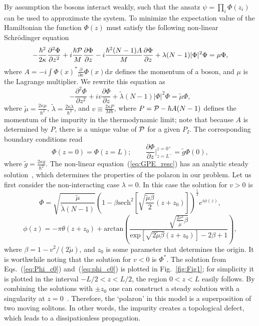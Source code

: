 \documentclass[twocolumn,amsmath,amssymb,showpacs,prl,superscriptaddress,aps]{revtex4-1}
\begin{document}
By assumption the bosons interact weakly, such that the ansatz $\psi=\prod_i \Phi(z_i)$ can be used to approximate the system. 
To minimize the expectation value of the Hamiltonian the function $\Phi(z)$ must satisfy the following non-linear Schr{\"o}dinger equation
\begin{equation}
-\frac{\hbar^2}{2\kappa}\frac{\partial^2\Phi}{\partial z^2}+i\frac{\hbar {\cal P}}{M}\frac{\partial \Phi}{\partial z}
-i \frac{\hbar^2 (N-1) A}{M} \frac{\partial\Phi}{\partial z} + \lambda (N-1)|\Phi|^2\Phi=\mu \Phi,
\end{equation}
where $A=-i\int \Phi(x)^*\frac{\partial}{\partial x}\Phi(x)\mathrm{d}x$ defines the momentum of a boson, and $\mu$ is the Lagrange multiplier. 
We rewrite this equation as
\begin{equation}
-\frac{\partial^2\Phi}{\partial z^2}+i v \frac{\partial \Phi}{\partial z} + \tilde \lambda (N-1)|\Phi|^2\Phi=\tilde\mu\Phi,
\label{eq:GPE_resc}
\end{equation}
where $\tilde\mu=\frac{2 \kappa \mu}{\hbar^2}$, $\tilde \lambda =\frac{2 \kappa \lambda}{\hbar^2}$, and 
$v\equiv \frac{2 \kappa P}{M \hbar}$, where $P={\cal P}-\hbar A(N-1)$ defines the momentum of the impurity in the thermodynamic limit;
note that because $A$ is determined by $P$, there is a unique value of ${\cal P}$ for a given $P_I$.
The corresponding boundary conditions read
\begin{equation}
\Phi(z=0)=\Phi(z=L); \qquad \frac{\partial \Phi}{\partial z}\bigg|^{z=0^+}_{z=L^-}= \tilde g \Phi(0),
\end{equation}
where $\tilde g= \frac{2\kappa g}{\hbar^2}$. The non-linear equation~(\ref{eq:GPE_resc}) 
has an analytic steady solution~\cite{hakim1997}, which determines the properties 
of the polaron in our problem. Let us first consider the non-interacting case $\lambda=0$. In this case the solution for $v>0$ is~\cite{tsuzuki1971, ishikawa1980}
\begin{equation}
\Phi=\sqrt{\frac{\tilde \mu}{\tilde \lambda (N-1)}}\left(1-\beta \mathrm{sech}^2\left[\sqrt{\frac{\tilde\mu\beta}{2}}(z+z_0)\right]\right)^{\frac{1}{2}}e^{i\phi(z)},
\label{eq:Phi_c0}
\end{equation}
\begin{equation}
\phi(z)=-\pi\theta(z+z_0)+\mathrm{arctan}\left(\frac{\sqrt{\frac{2 v^2}{\tilde \mu}\beta}}{\mathrm{exp}\left[\sqrt{2\tilde \mu\beta}(z+z_0)\right]-2\beta+1}\right),
\label{eq:phi_c0}
\end{equation}
where  $\beta=1- v^2/(2\tilde \mu)$, and $z_0$ is some parameter that determines the origin. It is worthwhile noting that the solution for $v<0$ is $\Phi^*$. 
The solution from Eqs.~(\ref{eq:Phi_c0}) and~(\ref{eq:phi_c0}) is plotted in Fig.~\ref{fig:Fig1}; 
for simplicity it is plotted in the interval $-L/2<z<L/2$, the region $0<z<L$ easily follows. By combining the solutions with $\pm z_0$ 
one can construct a steady solution with a singularity at $z=0$~\cite{hakim1997}. Therefore, the `polaron' in this model is a superposition of two moving solitons. 
In other words, the impurity creates a topological defect, which leads to a dissipationless propagation. 
\end{document}
